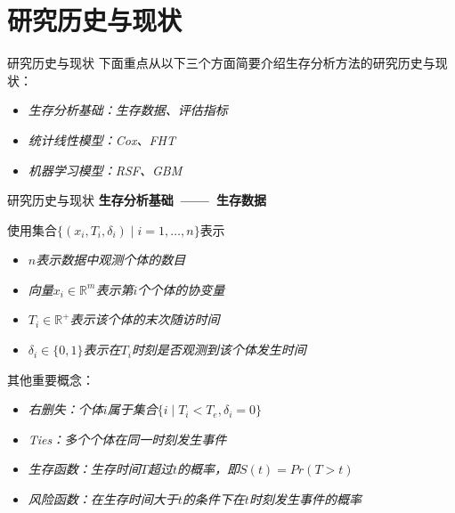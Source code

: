 \documentclass[10pt]{beamer}
\begin{document}
\section{研究历史与现状}

\begin{frame}{研究历史与现状}
  下面重点从以下三个方面简要介绍生存分析方法的研究历史与现状：
  \begin{itemize}
    \item \textit{生存分析基础：生存数据、评估指标}
    \item \textit{统计线性模型：Cox、FHT}
    \item \textit{机器学习模型：RSF、GBM}
  \end{itemize}
\end{frame}

\begin{frame}{研究历史与现状}
  \textbf{生存分析基础\ ——\ 生存数据}
  
  使用集合$\{(x_i,T_i,\delta_i ) \mid i=1,\dots,n\}$表示
  \begin{itemize}
    \item \textit{$n$表示数据中观测个体的数目}
    \item \textit{向量$x_i\in \mathbb{R}^m$表示第$i$个个体的协变量}
    \item \textit{$T_i\in \mathbb{R}^+$表示该个体的末次随访时间}
    \item \textit{$\delta_i\in \{0,1\}$表示在$T_i$时刻是否观测到该个体发生时间}
  \end{itemize}

  其他重要概念：
  \begin{itemize}
    \item \textit{右删失：个体$i$属于集合$\{i \mid T_i<T_e,\delta_i=0\}$}
    \item \textit{Ties：多个个体在同一时刻发生事件}
    \item \textit{生存函数：生存时间$T$超过$t$的概率，即$S(t)=Pr(T>t)$}
    \item \textit{风险函数：在生存时间大于$t$的条件下在$t$时刻发生事件的概率}
  \end{itemize}

\end{frame}
\end{document}
